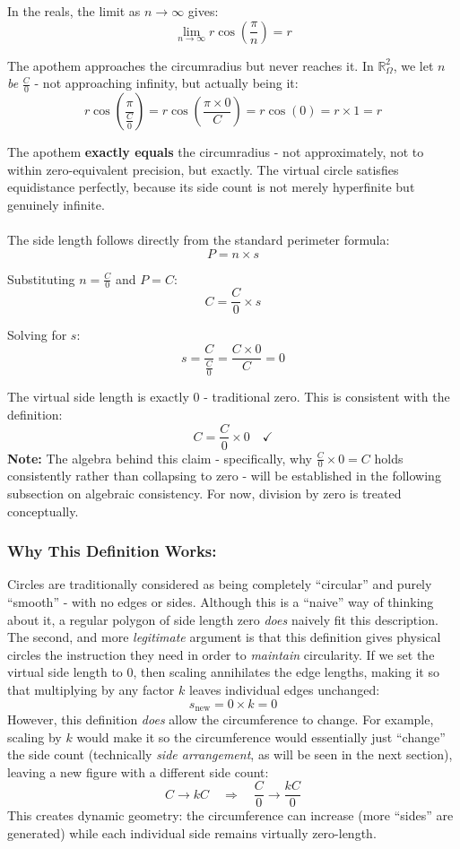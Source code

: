 \documentclass{article}
\begin{document}
In the reals, the limit as $n \to \infty$ gives:
$$\lim_{n \to \infty} r\cos\left(\frac{\pi}{n}\right) = r$$

The apothem approaches the circumradius but never reaches it. In 
$\mathbb{R}_\Omega^2$, we let $n$ \textit{be} $\frac{C}{0}$ - not approaching 
infinity, but actually being it:
$$r\cos\left(\frac{\pi}{\frac{C}{0}}\right) = r\cos\left(\frac{\pi \times 0}{C}\right) = r\cos(0) = r \times 1 = r$$

The apothem \textbf{exactly equals} the circumradius - not approximately, not 
to within zero-equivalent precision, but exactly. The virtual circle satisfies 
equidistance perfectly, because its side count is not merely hyperfinite but 
genuinely infinite.\\\\
The side length follows directly from the standard perimeter formula:
$$P = n \times s$$

Substituting $n = \frac{C}{0}$ and $P = C$:
$$C = \frac{C}{0} \times s$$

Solving for $s$:
$$s = \frac{C}{\frac{C}{0}} = \frac{C \times 0}{C} = 0$$

The virtual side length is exactly $0$ - traditional zero. This is consistent 
with the definition:
$$C = \frac{C}{0} \times 0 \quad \checkmark$$ \textbf{Note:} The algebra behind this claim - specifically, why 
$\frac{C}{0} \times 0 = C$ holds consistently rather than collapsing to 
zero - will be established in the following subsection on algebraic 
consistency. For now, division by zero is treated conceptually.

\subsubsection*{Why This Definition Works:}

Circles are traditionally considered as being completely “circular” and purely “smooth” - with no edges or sides. Although this is a ``naive'' way of thinking about it, a regular polygon of side length zero \textit{does} naively fit this description. \\The second, and more \textit{legitimate} argument is that this definition gives physical circles the instruction they need in order to \textit{maintain} circularity. If we set the  virtual side length to $0$, then scaling annihilates the edge lengths, making it so that multiplying by any factor $k$ leaves individual edges unchanged:
$$s_{\text{new}} = 0 \times k = 0$$However, this definition \textit{does} allow the circumference to change. For example, scaling by $k$ would make it so the circumference would essentially just ``change'' the side count (technically \textit{side arrangement}, as will be seen in the next section), leaving a new figure with a different side count:
$$C \to kC \quad \Rightarrow \quad \frac{C}{0} \to \frac{kC}{0}$$This creates dynamic geometry: the circumference can increase (more ``sides'' are generated) while each individual side remains virtually zero-length.
\end{document}
